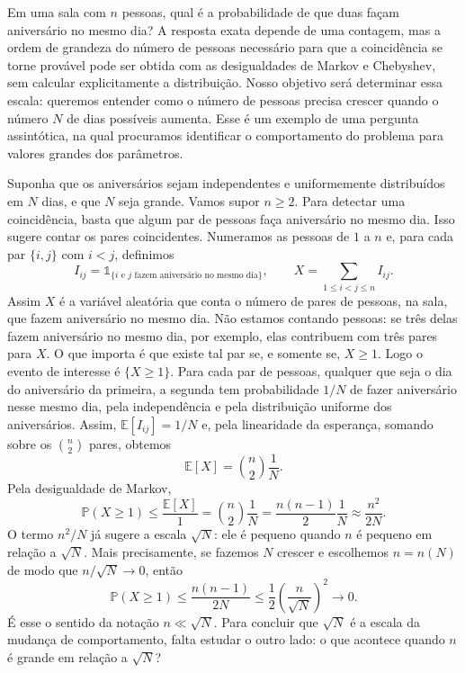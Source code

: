 \documentclass[12pt,portuguese]{article}
\theoremstyle{definition}
\theoremstyle{plainexercise}
\theoremstyle{starredexercise}
\theoremstyle{definition}
\begin{document}
Em uma sala com $n$ pessoas, qual é a probabilidade de que duas façam
aniversário no mesmo dia? A resposta exata depende de uma contagem, mas a
ordem de grandeza do número de pessoas necessário para que a coincidência se
torne provável pode ser obtida com as desigualdades de Markov e Chebyshev,
sem calcular explicitamente a distribuição. Nosso objetivo será determinar
essa escala: queremos entender como o número de pessoas precisa crescer
quando o número $N$ de dias possíveis aumenta. Esse é um exemplo de uma
pergunta assintótica, na qual procuramos identificar o comportamento do
problema para valores grandes dos parâmetros.

Suponha que os aniversários sejam independentes e uniformemente distribuídos
em $N$ dias, e que $N$ seja grande. Vamos supor $n\geqslant2$.
Para detectar uma coincidência, basta que algum par de pessoas faça
aniversário no mesmo dia. Isso sugere contar os pares coincidentes.
Numeramos as pessoas de $1$ a $n$ e, para
cada par $\{i,j\}$ com $i<j$, definimos
\[
I_{ij}=\mathds{1}_{\{i\text{ e }j\text{ fazem aniversário no mesmo dia}\}},
\qquad
X=\sum_{1\leqslant i<j\leqslant n}I_{ij}.
\]
Assim $X$ é a variável aleatória que conta o número de pares de pessoas, na sala,
que fazem aniversário no mesmo dia. Não estamos contando pessoas: se três
delas fazem aniversário no mesmo dia, por exemplo, elas contribuem com três
pares para $X$. O que importa é que existe tal par se, e somente se, $X\geqslant1$. Logo o evento de interesse é
$\{X\geqslant1\}$. Para cada par de pessoas, qualquer que seja o dia do
aniversário da primeira, a segunda tem probabilidade $1/N$ de fazer
aniversário nesse mesmo dia, pela independência e pela distribuição uniforme
dos aniversários. Assim, $\mathbb{E}[I_{ij}]=1/N$ e, pela linearidade da
esperança, somando sobre os $\binom{n}{2}$ pares, obtemos
\[
\mathbb{E}[X]=\binom{n}{2}\frac{1}{N}.
\]
Pela desigualdade de Markov,
\begin{equation}\label{eq:aniversarios-markov}
\mathbb{P}(X\geqslant1)
\leqslant \frac{\mathbb{E}[X]}{1}
=
\binom{n}{2}\frac{1}{N}
=
\frac{n(n-1)}{2} \frac{1}{N}
\approx\frac{n^2}{2N}.
\end{equation}
O termo $n^2/N$ já sugere a escala $\sqrt N$: ele é pequeno quando $n$ é
pequeno em relação a $\sqrt N$. Mais precisamente, se fazemos $N$ crescer
e escolhemos $n=n(N)$ de modo que $n/\sqrt N\to0$, então
\[
\mathbb{P}(X\geqslant1)
\leqslant\frac{n(n-1)}{2N}
\leqslant\frac12\left(\frac{n}{\sqrt N}\right)^2
\longrightarrow0.
\]
É esse o sentido da notação $n\ll\sqrt N$. Para concluir que $\sqrt N$
é a escala da mudança de comportamento, falta estudar o outro lado:
o que acontece quando $n$ é grande em relação a $\sqrt N$?
\end{document}
